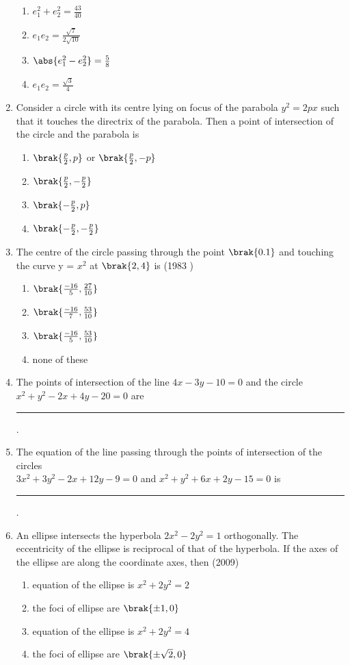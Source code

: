 \begin{enumerate}
		 \begin{enumerate}
			\item $e_1^2+e_2^2=\frac{43}{40}$
			\item $e_1e_2=\frac{\sqrt{7}}{2\sqrt{10}}$
			\item $\abs{ e_1^2-e_2^2}=\frac{5}{8}$
			\item $e_1e_2=\frac{\sqrt{3}}{4}$ 
		 \end{enumerate}
\item Consider a circle with its centre lying on focus of the parabola $y^2=2px$ such that it touches the directrix of the parabola. Then a point of intersection of the circle and the parabola is
        \hfill{}
\begin{enumerate}
    \item $\brak{\frac{p}{2},p}$ or $\brak{\frac{p}{2},-p}$
    \item $\brak{\frac{p}{2},-\frac{p}{2}}$
    \item $\brak{-\frac{p}{2},p}$
    \item $\brak{-\frac{p}{2},-\frac{p}{2}}$
\end{enumerate}
    \item The centre of the circle passing through the point $\brak{0.1}$ and touching the curve y = $x^{2}$ at $\brak{2, 4}$ is
    \hfill {(1983 )}
    	\begin{multicols}{2}
\begin{enumerate}
    		\item $\brak{\frac{-16}{5}, \frac{27}{10}}$
    		\item $\brak{\frac{-16}{7}, \frac{53}{10}}$
    		\item $\brak{\frac{-16}{5}, \frac{53}{10}}$
    		\item none of these
    	\end{enumerate}
    \end{multicols}
\item The points of intersection of the line $4x-3y-10=0$ and the circle $x^{2}+y^{2}-2x+4y-20=0$ are    \rule{1cm}{0.01pt}.
	\hfill{}
\item The equation of the line passing through the points of intersection of the circles\\ $3x^{2}+3y^{2}-2x+12y-9=0$ and $x^{2}+y^{2}+6x+2y-15=0$ is
\rule{1cm}{0.01pt}.
	\hfill{}
\item An ellipse intersects the hyperbola $2x^2-2y^2=1$ orthogonally. The eccentricity of the ellipse is reciprocal of that of the hyperbola. If the axes of the ellipse are along the coordinate axes, then \hfill(2009)\\
		\begin{enumerate}
			\item equation of the ellipse is $x^2+2y^2=2$
			\item the foci of ellipse are $\brak{\pm1,0}$
			\item equation of the ellipse is $x^2+2y^2=4$
			\item the foci of ellipse are $\brak{\pm\sqrt{2},0}$
		\end{enumerate}


\end{enumerate}
